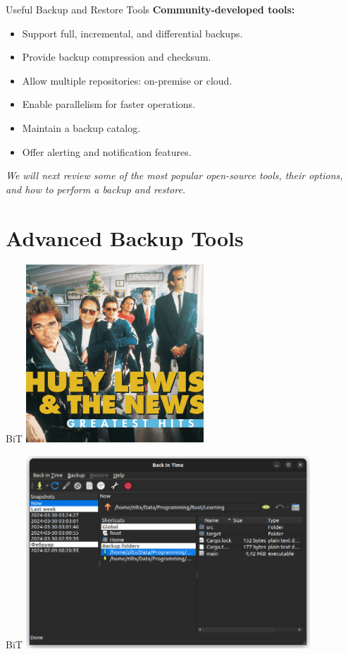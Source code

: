 \documentclass[aspectratio=169]{beamer}
\begin{document}
\begin{frame}{Useful Backup and Restore Tools}
    \textbf{Community-developed tools:}
    \begin{itemize}
        \item Support full, incremental, and differential backups.
        \item Provide backup compression and checksum.
        \item Allow multiple repositories: on-premise or cloud.
        \item Enable parallelism for faster operations.
        \item Maintain a backup catalog.
        \item Offer alerting and notification features.
    \end{itemize}

    \textit{We will next review some of the most popular open-source tools, their options, and how to perform a backup and restore.}
\end{frame}

\section{Advanced Backup Tools}

\begin{frame}{BiT}
    \centering
    \href{https://youtu.be/ur57IunS9To?si=-SAIS_yF9kMLX_mg}{
        \includegraphics[width=0.5\textwidth]{figures/BiT}
    }
\end{frame}

\begin{frame}{BiT}
    \centering
    \href{https://backintime.readthedocs.io/en/latest/}{
        \includegraphics[width=0.8\textwidth]{figures/BackInTime}
    }
\end{frame}
\end{document}
